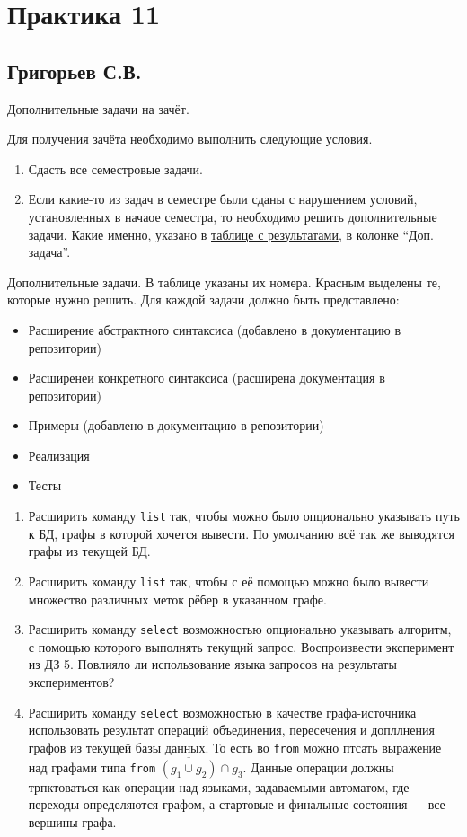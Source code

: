 \section{Практика 11}

\subsection{Григорьев С.В.}


Дополнительные задачи на зачёт.

Для получения зачёта необходимо выполнить следующие условия.

\begin{enumerate}
\item Сдасть все семестровые задачи.
\item Если какие-то из задач в семестре были сданы с нарушением условий, установленных в начаое семестра, то необходимо решить дополнительные задачи. Какие именно, указано в \href{https://docs.google.com/spreadsheets/d/1g1ZVACS0ATW7pVpvSI6L4mLKsxyuJEVh_HX6xhQRdmI/edit#gid=0}{таблице с результатами}, в колонке ``Доп. задача''.
\end{enumerate}

Дополнительные задачи. В таблице указаны их номера. Красным выделены те, которые нужно решить.
Для каждой задачи должно быть представлено:
\begin{itemize}
	\item Расширение абстрактного синтаксиса (добавлено в документацию в репозитории)
	\item Расширенеи конкретного синтаксиса (расширена документация в репозитории)
	\item Примеры (добавлено в документацию в репозитории)
	\item Реализация
	\item Тесты
\end{itemize}
\begin{enumerate}
  \item Расширить команду \verb|list| так, чтобы можно было опционально указывать путь к БД, графы в которой хочется вывести. По умолчанию всё так же выводятся графы из текущей БД.
  \item Расширить команду \verb|list| так, чтобы с её помощью можно было вывести множество различных меток рёбер в указанном графе.

  \item Расширить команду \verb|select| возможностью опционально указывать алгоритм, с помощью которого выполнять текущий запрос. Воспроизвести эксперимент из ДЗ 5. Повлияло ли использование языка запросов на результаты экспериментов?

  \item Расширить команду \verb|select| возможностью в качестве графа-источника использовать результат операций объединения, пересечения и допллнения графов из текущей базы данных. То есть во \verb|from| можно птсать выражение над графами типа \verb|from| $\overline{(g_1 \cup g_2)} \cap g_3$. Данные операции должны трпктоваться как операции над языками, задаваемыми автоматом, где переходы определяются графом, а стартовые и финальные состояния --- все вершины графа.


\end{enumerate}
